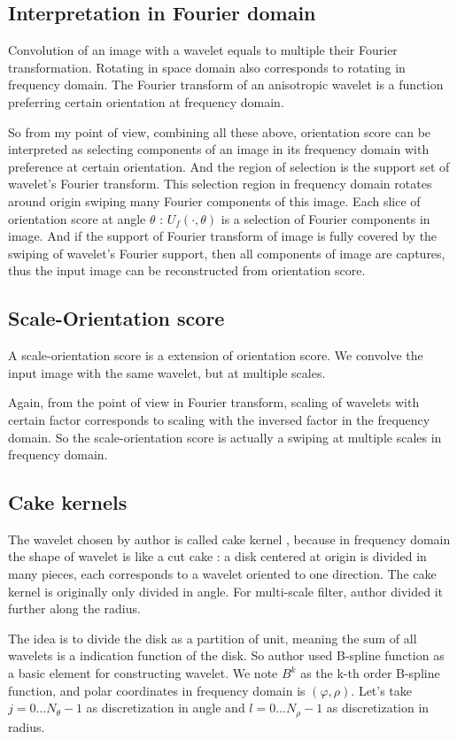\documentclass{article}
\begin{document}
	\subsection{Interpretation in Fourier domain}
	Convolution of an image with a wavelet equals to multiple their Fourier transformation. Rotating in space domain also corresponds to rotating in frequency domain. The Fourier transform of an anisotropic wavelet is a function preferring certain orientation at frequency domain.
	
	So from my point of view, combining all these above, orientation score can be interpreted as selecting components of an image in its frequency domain with preference at certain orientation. And the region of selection is the support set of wavelet's Fourier transform. This selection region in frequency domain rotates around origin swiping many Fourier components of this image. Each slice of orientation score at angle $\theta$ : $U_f(\cdot,\theta)$ is a selection of Fourier components in image. And if the support of Fourier transform of image is fully covered by the swiping of wavelet's Fourier support, then all components of image are captures, thus the input image can be reconstructed from orientation score.
	
	\subsection{Scale-Orientation score}
	A scale-orientation score is a extension of orientation score. We convolve the input image with the same wavelet, but at multiple scales.
	
	Again, from the point of view in Fourier transform, scaling of wavelets with certain factor corresponds to scaling with the inversed factor in the frequency domain. So the scale-orientation score is actually a swiping at multiple scales in frequency domain.
	
	\subsection{Cake kernels}
	The wavelet chosen by author is called cake kernel \cite{franken2008enhancement}, because in frequency domain the shape of wavelet is like a cut cake : a disk centered at origin is divided in many pieces, each corresponds to a wavelet oriented to one direction. The cake kernel is originally only divided in angle. For multi-scale filter, author divided it further along the radius.
	
	The idea is to divide the disk as a partition of unit, meaning the sum of all wavelets is a indication function of the disk. So author used B-spline function as a basic element for constructing wavelet. We note $B^k$ as the k-th order B-spline function, and polar coordinates in frequency domain is $(\varphi,\rho)$. Let's take $j=0\dots N_\theta-1$ as discretization in angle and $l=0\dots N_\rho-1$ as discretization in radius.
	
\end{document}
